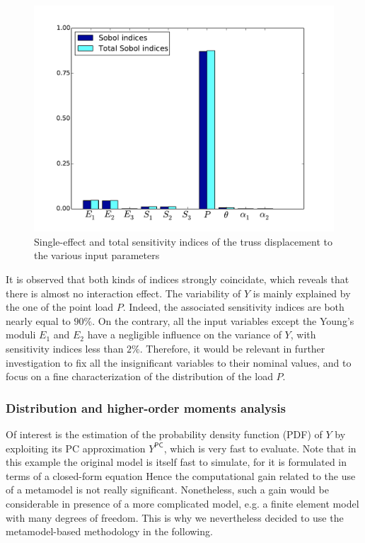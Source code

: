\documentclass[11pt]{article}
\begin{document}
\begin{figure}[Hhbtp]
  \begin{center}
    \includegraphics[width=12cm]{Figures/Truss_SA.pdf}
  \end{center}
  \caption{Single-effect and total sensitivity indices of the truss displacement to the various input parameters}
  \label{fig_SA}
\end{figure}

It is observed that both kinds of indices strongly coincidate, which reveals that there is almost no interaction effect. The variability of $Y$ is mainly explained by the one of the point load $P$. Indeed, the associated sensitivity indices are both nearly equal to $90\%$. On the contrary, all the input variables except the Young's moduli $E_1$ and $E_2$ have a negligible influence on the variance of $Y$, with sensitivity indices less than $2\%$. Therefore, it would be relevant in further investigation to fix all the insignificant variables to their nominal values, and to focus on a fine characterization of the distribution of the load $P$.

\subsubsection{Distribution and higher-order moments analysis}

Of interest is the estimation of the probability density function (PDF) of $Y$ by exploiting its PC approximation $Y^\textsf{PC}$, which is very fast to evaluate. Note that in this example the original model is itself fast to simulate, for it is formulated in terms of a closed-form equation Hence the computational gain related to the use of a metamodel is not really significant. Nonetheless, such a gain would be considerable in presence of a more complicated model, e.g. a finite element model with many degrees of freedom. This is why we nevertheless decided to use the metamodel-based methodology in the following. \\
\end{document}
